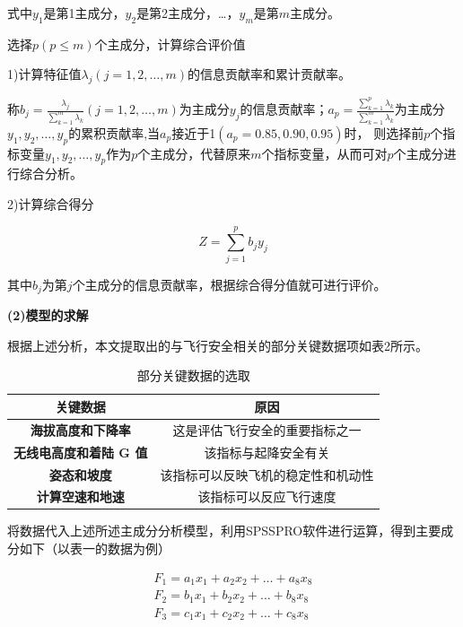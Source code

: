\documentclass[UTF8]{ctexart}
\begin{document}
	式中$y_1$是第1主成分，$y_2$是第2主成分，…，$y_m$是第$m$主成分。\par
	[4]选择$p\left( p\leq m \right) $个主成分，计算综合评价值\par
	1)计算特征值$\lambda _j\left( j=1,2,…,m \right) $的信息贡献率和累计贡献率。\par
	称$b_j=\frac{\lambda _j}{\sum_{k=1}^m{\lambda _k}}\left( j=1,2,…,m \right)$为主成分$y_j$的信息贡献率；$a_p=\frac{\sum_{k=1}^p{\lambda _k}}{\sum_{k=1}^m{\lambda _k}}$为主成分$y_1,y_2,…,y_p$的累积贡献率,当$a_p$接近于1$\left( a_p=0.85,0.90,0.95 \right)$时， 则选择前$p$个指标变量$y_1,y_2,…,y_p$作为$p$个主成分，代替原来$m$个指标变量，从而可对$p$个主成分进行综合分析。\par
	2)计算综合得分\par
	\begin{equation}
		Z=\sum_{j=1}^p{b_jy_j}
	\end{equation}\par
	其中$b_j$为第$j$个主成分的信息贡献率，根据综合得分值就可进行评价。\par
	\textbf{(2)模型的求解} \par 
	根据上述分析，本文提取出的与飞行安全相关的部分关键数据项如表2所示。\par 
	\begin{table}[!ht]
		\centering
		\caption{部分关键数据的选取 }
		\begin{tabular}{|c|c|}
			\hline
			\textbf{关键数据 } & \textbf{原因 } \\ \hline
			\textbf{海拔高度和下降率 } & 这是评估飞行安全的重要指标之一  \\ 
			\textbf{无线电高度和着陆 G 值 } & 该指标与起降安全有关  \\ 
			\textbf{姿态和坡度 } & 该指标可以反映飞机的稳定性和机动性  \\ 
			\textbf{计算空速和地速 } & 该指标可以反应飞行速度 \\ \hline
		\end{tabular}
	\end{table} \par 
	将数据代入上述所述主成分分析模型，利用SPSSPRO软件进行运算，得到主要成分如下（以表一的数据为例）  \par 
	\begin{equation}
		\begin{aligned}
			F_1=a_1x_1+a_2x_2+…+a_8x_8
			\\
			F_2=b_1x_1+b_2x_2+…+b_8x_8
			\\
			F_3=c_1x_1+c_2x_2+…+c_8x_8
		\end{aligned}
	\end{equation}\par
\end{document}
